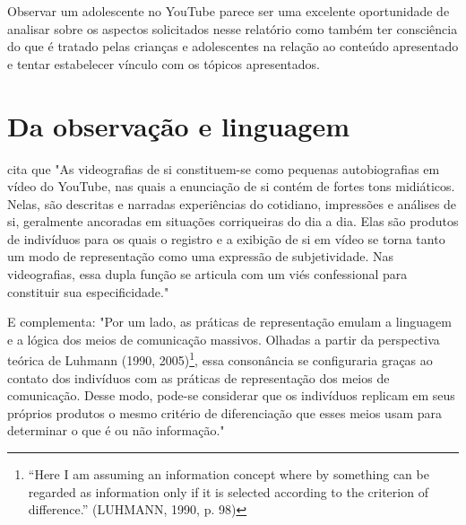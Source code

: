 Observar um adolescente no YouTube parece ser uma excelente oportunidade de analisar sobre os aspectos solicitados nesse relatório como também ter consciência do que é tratado pelas crianças e adolescentes na relação ao conteúdo apresentado e tentar estabelecer vínculo com os tópicos apresentados.



\section{Da observação e linguagem}

 cita que "As videografias de si constituem-se como pequenas autobiografias em vídeo do YouTube, nas quais a enunciação de si contém de fortes tons midiáticos. Nelas, são descritas e narradas experiências do cotidiano, impressões e análises de si, geralmente ancoradas em situações corriqueiras do dia a dia. Elas são produtos de indivíduos para os quais o registro e a exibição de si em vídeo se torna tanto um modo de representação como uma expressão de subjetividade. Nas videografias, essa dupla função se articula com um viés confessional para constituir sua especificidade."

E complementa: "Por um lado, as práticas de representação emulam a linguagem e a lógica dos meios de comunicação massivos. Olhadas a partir da perspectiva teórica de Luhmann (1990, 2005)\footnote{“Here I am assuming an information concept where by something can be regarded as information only if it is selected according to the criterion of difference.” (LUHMANN, 1990, p. 98)}, essa consonância se configuraria graças ao contato dos indivíduos com as práticas de representação dos meios de comunicação. Desse modo, pode-se considerar que os indivíduos replicam em seus próprios produtos o mesmo critério de diferenciação que esses meios usam para determinar o que é ou não informação."



